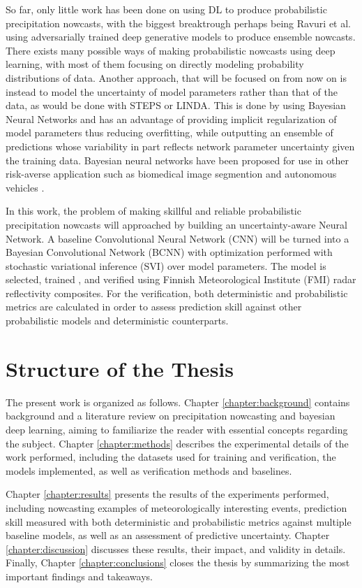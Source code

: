 So far, only little work has been done on using DL to produce probabilistic precipitation nowcasts, with the biggest breaktrough perhaps being Ravuri et al. \cite{ravuri_skilful_2021} using adversarially trained deep generative models to produce ensemble nowcasts. There exists many possible ways of making probabilistic nowcasts using deep learning, with most of them focusing on directly modeling probability distributions of data. Another approach, that will be focused on from now on is instead to model the uncertainty of model parameters rather than that of the data, as would be done with STEPS or LINDA. This is done by using Bayesian Neural Networks and has an advantage of providing implicit regularization of model parameters thus reducing overfitting, while outputting an ensemble of predictions whose variability in part reflects network parameter uncertainty given the training data. Bayesian neural networks have been proposed for use in other risk-averse application such as biomedical image segmention \cite{kwon_uncertainty_2020} and autonomous vehicles \cite{mcallister_concrete_2017}. 

In this work, the problem of making skillful and reliable probabilistic precipitation nowcasts will approached by building an uncertainty-aware Neural Network. A baseline Convolutional Neural Network (CNN) will be turned into a Bayesian Convolutional Network (BCNN) with optimization performed with stochastic variational inference (SVI) over model parameters. The model is selected, trained , and verified using Finnish Meteorological Institute (FMI) radar reflectivity composites. For the verification, both deterministic and probabilistic metrics are calculated in order to assess prediction skill against other probabilistic models and deterministic counterparts. 


\section{Structure of the Thesis}

The present work is organized as follows. Chapter \ref{chapter:background} contains background and a literature review on precipitation nowcasting and bayesian deep learning, aiming to familiarize the reader with essential concepts regarding the subject. Chapter \ref{chapter:methods} describes the experimental details of the work performed, including the datasets used for training and verification, the models implemented, as well as verification methods and baselines. 

Chapter \ref{chapter:results} presents the results of the experiments performed, including nowcasting examples of meteorologically interesting events, prediction skill measured with both deterministic and probabilistic metrics against multiple baseline models, as well as an assessment of predictive uncertainty. Chapter \ref{chapter:discussion} discusses these results, their impact, and validity in details. Finally, Chapter \ref{chapter:conclusions} closes the thesis by summarizing the most important findings and takeaways. 


